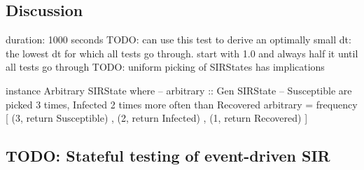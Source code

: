 \subsection{Discussion}
duration: 1000 seconds
TODO: can use this test to derive an optimally small dt: the lowest dt for which all tests go through. start with 1.0 and always half it until all tests go through
TODO: uniform picking of SIRStates has implications

\begin{HaskellCode}
instance Arbitrary SIRState where
  -- arbitrary :: Gen SIRState
  -- Susceptible are picked 3 times, Infected 2 times more often than Recovered
  arbitrary = frequency [ (3, return Susceptible)
                        , (2, return Infected)
                        , (1, return Recovered) ]
\end{HaskellCode}

\subsection{TODO: Stateful testing of event-driven SIR}